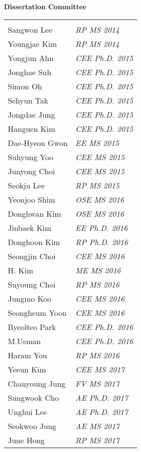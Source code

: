 \newpage
{\bf Dissertation Committee}\\
\begin{tabular}{ @{} l @{\hspace{10ex}} >{\itshape}l }
                  & \\
  Sangwon Lee	    & \ac{RP}	MS	2014\\
  Youngjae Kim	  & \ac{RP}	MS	2014\\
  Yongjun Ahn	    & \ac{CEE}	Ph.D.	2015\\
  Jonghae Suh	    & \ac{CEE}	Ph.D.	2015\\
  Simon Oh	      & \ac{CEE}	Ph.D.	2015\\
  Sehyun Tak	    & \ac{CEE}	Ph.D.	2015\\
  Jongdae Jung	  & \ac{CEE}	Ph.D.	2015\\
  Hanguen Kim	    & \ac{CEE}	Ph.D.	2015\\
  Dae-Hyeon Gwon	& \ac{EE}	MS	2015\\
  Suhyung Yoo	    & \ac{CEE}	MS	2015\\
  Junyong Choi	  & \ac{CEE}	MS	2015\\
  Seokju Lee	    & \ac{RP}	MS	2015\\
  Yeonjoo Shim	  & \ac{OSE}	MS	2016\\
  Donghwan Kim	  & \ac{OSE}	MS	2016\\
  Jinbaek Kim	    & \ac{EE}	Ph.D.	2016\\
  Donghoon Kim	  & \ac{RP}	Ph.D.	2016\\
  Seongjin Choi	  & \ac{CEE}	MS	2016\\
  H. Kim	        & \ac{ME}	MS	2016\\
  Suyoung Choi	  & \ac{RP}	MS	2016\\
  Jungmo Koo	    & \ac{CEE}	MS	2016\\
  Seongheum Yoon	& \ac{CEE}	MS	2016\\
  Byeolteo Park	  & \ac{CEE}	Ph.D.	2016\\
  M.Usman	        & \ac{CEE}	Ph.D.	2016\\
  Haram You	      & \ac{RP}	MS	2016\\
  Yeeun Kim	      & \ac{CEE}	MS	2017\\
  Chanyoung Jung	& \ac{FV}	MS	2017\\
  Sungwook Cho	  & \ac{AE}	Ph.D.	2017\\
  Unghui Lee	    & \ac{AE}	Ph.D.	2017\\
  Seokwoo Jung	  & \ac{AE}	MS	2017\\
  June Hong	      & \ac{RP}	MS	2017\\

\end{tabular}
